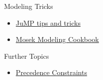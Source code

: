 \begin{resource}
Modeling Tricks
\begin{itemize}
\item \href{https://jump.dev/JuMP.jl/stable/tutorials/linear/tips_and_tricks/}{JuMP tips and tricks}
\item \href{https://docs.mosek.com/modeling-cookbook/mio.html}{Mosek Modeling Cookbook}
\end{itemize}

{Further Topics}
\begin{itemize}
\item \href{https://or.stackexchange.com/questions/1319/best-model-for-precedence-constraints-within-scheduling-problem}{Precedence Constraints}
\end{itemize}
\end{resource}

